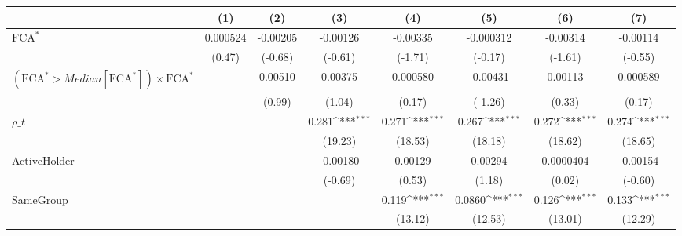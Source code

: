 {
\def\sym#1{\ifmmode^{#1}\else\(^{#1}\)\fi}
\begin{tabular}{l*{7}{c}}
\hline\hline
                    &\multicolumn{1}{c}{(1)}         &\multicolumn{1}{c}{(2)}         &\multicolumn{1}{c}{(3)}         &\multicolumn{1}{c}{(4)}         &\multicolumn{1}{c}{(5)}         &\multicolumn{1}{c}{(6)}         &\multicolumn{1}{c}{(7)}         \\
\hline
$ \text{FCA}^* $    &    0.000524         &    -0.00205         &    -0.00126         &    -0.00335         &   -0.000312         &    -0.00314         &    -0.00114         \\
                    &      (0.47)         &     (-0.68)         &     (-0.61)         &     (-1.71)         &     (-0.17)         &     (-1.61)         &     (-0.55)         \\
[1em]
 $ (\text{FCA}^* > Median[\text{FCA}^*]) \times {\text{FCA} ^*}  $ &                     &     0.00510         &     0.00375         &    0.000580         &    -0.00431         &     0.00113         &    0.000589         \\
                    &                     &      (0.99)         &      (1.04)         &      (0.17)         &     (-1.26)         &      (0.33)         &      (0.17)         \\
[1em]
$ \rho\_t $          &                     &                     &       0.281\sym{***}&       0.271\sym{***}&       0.267\sym{***}&       0.272\sym{***}&       0.274\sym{***}\\
                    &                     &                     &     (19.23)         &     (18.53)         &     (18.18)         &     (18.62)         &     (18.65)         \\
[1em]
ActiveHolder        &                     &                     &    -0.00180         &     0.00129         &     0.00294         &   0.0000404         &    -0.00154         \\
                    &                     &                     &     (-0.69)         &      (0.53)         &      (1.18)         &      (0.02)         &     (-0.60)         \\
[1em]
SameGroup           &                     &                     &                     &       0.119\sym{***}&      0.0860\sym{***}&       0.126\sym{***}&       0.133\sym{***}\\
                    &                     &                     &                     &     (13.12)         &     (12.53)         &     (13.01)         &     (12.29)         \\

\end{tabular}}
